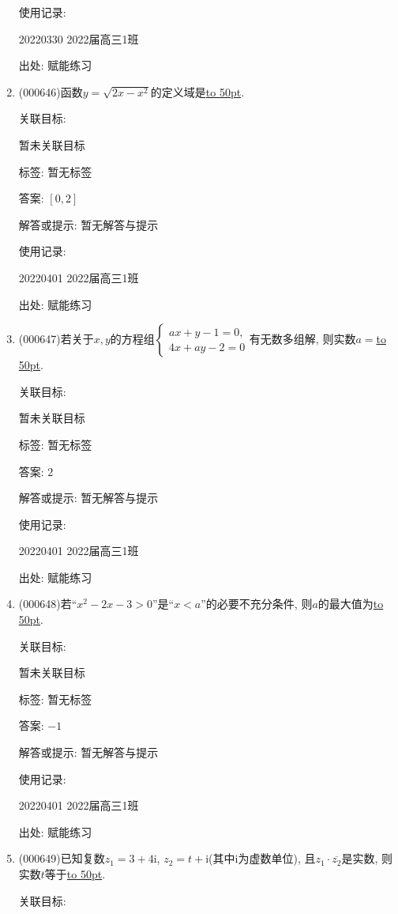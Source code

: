 \documentclass[10pt,a4paper]{article}
\newcommand{\blank}[1]{\underline{\hbox to #1pt{}}}
\begin{document}
\begin{enumerate}[1.]
使用记录:

20220330	2022届高三1班	


出处: 赋能练习
\item { (000646)}函数$y=\sqrt{2x-x^2}$的定义域是\blank{50}.


关联目标:

暂未关联目标



标签: 暂无标签

答案: $[0,2]$

解答或提示: 暂无解答与提示

使用记录:

20220401	2022届高三1班	


出处: 赋能练习
\item { (000647)}若关于$x,y$的方程组$\begin{cases} ax+y-1=0,  \\ 4x+ay-2=0  \end{cases}$有无数多组解, 则实数$a=$\blank{50}.


关联目标:

暂未关联目标



标签: 暂无标签

答案: $2$

解答或提示: 暂无解答与提示

使用记录:

20220401	2022届高三1班	


出处: 赋能练习
\item { (000648)}若``$x^2-2x-3>0$''是``$x<a$''的必要不充分条件, 则$a$的最大值为\blank{50}.


关联目标:

暂未关联目标



标签: 暂无标签

答案: $-1$

解答或提示: 暂无解答与提示

使用记录:

20220401	2022届高三1班	


出处: 赋能练习
\item { (000649)}已知复数$z_1=3+4\mathrm{i}$, $z_2=t+\mathrm{i}$(其中$\mathrm{i}$为虚数单位), 且$z_1\cdot \overline{z_2}$是实数, 则实数$t$等于\blank{50}.


关联目标:


\end{enumerate}
\end{document}

